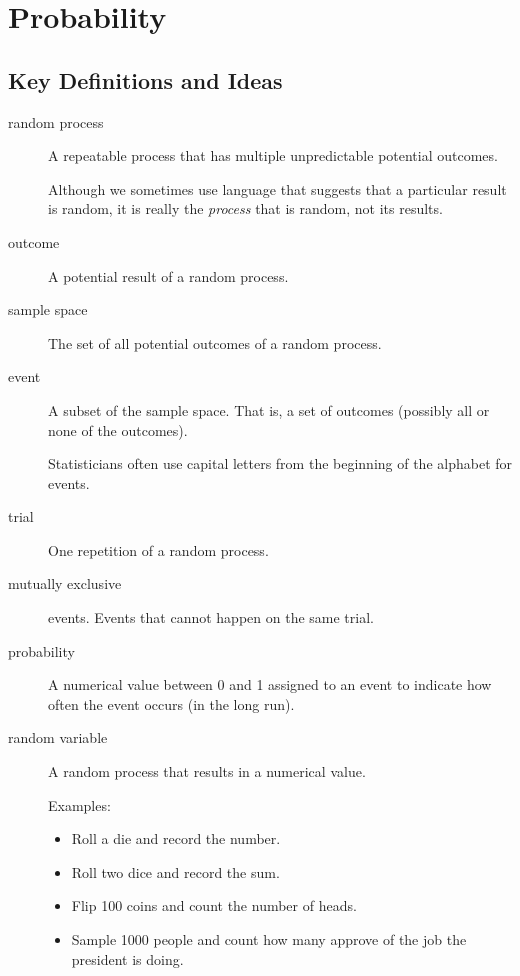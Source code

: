\documentclass[twoside]{book}\usepackage[]{graphicx}\usepackage[]{xcolor}
\def\Chapter#1{%
\chapter{#1}
}
\newif\ifsolutions
\newif\ifsolutionslocal
\begin{document}
\shipoutProblems

\ifsolutions
\ifsolutionslocal
\newpage
\section*{Solutions}
\shipoutSolutions
\fi
\fi




\Chapter{Probability}

\section{Key Definitions and Ideas}

\begin{description}
\item[random process]
A repeatable process that has multiple unpredictable potential outcomes.

Although we sometimes use language that suggests that a particular result is 
random, it is really the \emph{process} that is random, not its results.

\item[outcome]
A potential result of a random process.

\item[sample space]
The set of all potential outcomes of a random process.

\item[event]
A subset of the sample space.  
That is, a set of outcomes (possibly all or none of the outcomes).

Statisticians often use capital letters from the beginning of the alphabet
for events.

\item[trial]One repetition of a random process.

\item[mutually exclusive] events.
Events that cannot happen on the same trial.

\item[probability]A numerical value between 0 and 1 assigned to 
an event to indicate how often the event occurs (in the long run).

\item[random variable]
A random process that results in a numerical value.

Examples: 
\begin{itemize}
\item
Roll a die and record the number.
\item
Roll two dice and record the sum.
\item
Flip 100 coins and count the number of heads.
\item
Sample 1000 people and count how many approve of the job the president is doing.
\end{itemize}


\end{description}
\end{document}

